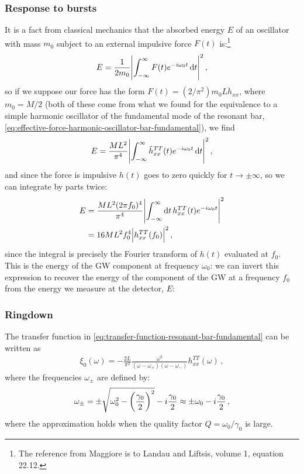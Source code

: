 \documentclass[main.tex]{subfiles}
\begin{document}
\subsubsection{Response to bursts}

It is a fact from classical mechanics that the absorbed energy \(E\) of an oscillator with mass \(m_0 \) subject to an external impulsive force \(F(t)\) is:\footnote{The reference from Maggiore is to Landau and Liftsis, volume 1, equation 22.12.} 
%
\begin{align}
E 
= \frac{1}{2 m_0 } \abs{ \int_{ - \infty }^{ \infty  } F(t) e^{-i \omega_0 t} \dd{t}}^2
\,,
\end{align}
%
so if we suppose our force has the form \(F(t) = (2 / \pi^2) m_0 L \ddot{h}_{xx}\), where \(m_0 = M/2\) (both of these come from what we found for the equivalence to a simple harmonic oscillator of the fundamental mode of the resonant bar, \eqref{eq:effective-force-harmonic-oscillator-bar-fundamental}), we find
%
\begin{align}
E = \frac{ML^2}{\pi^{4} } \abs{ \int_{ - \infty }^{ \infty  } \ddot{h}_{xx}^{TT}(t) e^{-i \omega_0 t} \dd{t}}^2
\,,
\end{align}
%
and since the force is impulsive \(h(t)\) goes to zero quickly for \(t \to \pm \infty \), so we can integrate by parts twice: 
%
\begin{align}
E &= \frac{M L^2 (2 \pi f_0 )^{4}}{\pi^{4}} 
\abs{\int_{- \infty }^{\infty} \dd{t} h_{xx}^{TT} (t) e^{-i \omega_0 t}}^2  \\
&= 16 M L^2 f_0^{4} \abs{h_{xx}^{TT} (f_0 )}^2
\,,
\end{align}
%
since the integral is precisely the Fourier transform of \(h(t)\) evaluated at \(f_0\).
This is the energy of the GW component at frequency \(\omega_0 \): we can invert this expression to recover the energy of the component of the GW at a frequency \(f_0 \) from the energy we measure at the detector, \(E\): 
%

\subsubsection{Ringdown}

The transfer function in \eqref{eq:transfer-function-resonant-bar-fundamental} can be written as 
%
\begin{align}
\xi_0 (\omega ) = - \frac{2L}{\pi^2} \frac{\omega^2}{(\omega - \omega_{+}) (\omega-\omega_{-})} h^{TT}_{xx} (\omega )
\,,
\end{align}
%
where the frequencies \(\omega_{\pm}\) are defined by: 
%
\begin{align}
\omega_{\pm} = \pm \sqrt{\omega_0 ^2 - \qty(\frac{\gamma_0 }{2})^2} - i \frac{\gamma_0 }{2} \approx \pm \omega_0 - i \frac{\gamma_0 }{2}
\,,
\end{align}
%
where the approximation holds when the quality factor \(Q = \omega_0 / \gamma_0 \) is large. 
\end{document}
